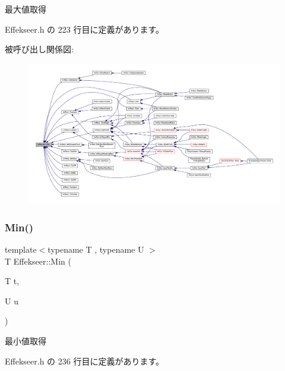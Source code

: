最大値取得 



 Effekseer.\+h の 223 行目に定義があります。

被呼び出し関係図\+:\nopagebreak
\begin{figure}[H]
\begin{center}
\leavevmode
\includegraphics[width=350pt]{namespace_effekseer_afc3d4e56cf4f8d0f12ac7d4bee7591b9_icgraph}
\end{center}
\end{figure}
\mbox{\label{namespace_effekseer_ad4d523c19d4088c7566fadd84449eba7}} 
\subsubsection{\texorpdfstring{Min()}{Min()}}
{\footnotesize\ttfamily template$<$typename T , typename U $>$ \\
T Effekseer\+::\+Min (\begin{DoxyParamCaption}\item[{T}]{t,  }\item[{U}]{u }\end{DoxyParamCaption})}



最小値取得 



 Effekseer.\+h の 236 行目に定義があります。

